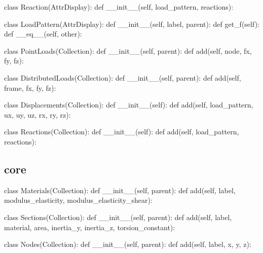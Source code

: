 \begin{codigoprog}
class Reaction(AttrDisplay):
    def __init__(self, load_pattern, reactions):
\end{codigoprog}

\begin{codigoprog}
class LoadPattern(AttrDisplay):
    def __init__(self, label, parent):
    def get_f(self):
    def __eq__(self, other):
\end{codigoprog}

\begin{codigoprog}
class PointLoads(Collection):
    def __init__(self, parent):
    def add(self, node, fx, fy, fz):
\end{codigoprog}

\begin{codigoprog}
class DistributedLoads(Collection):
    def __init__(self, parent):
    def add(self, frame, fx, fy, fz):
\end{codigoprog}

\begin{codigoprog}
class Displacements(Collection):
    def __init__(self):
    def add(self, load_pattern, ux, uy, uz, rx, ry, rz):
\end{codigoprog}

\begin{codigoprog}
class Reactions(Collection):
    def __init__(self):
    def add(self, load_pattern, reactions):
\end{codigoprog}


 \subsection{core}
 
\begin{codigoprog}
class Materials(Collection):
    def __init__(self, parent):
    def add(self, label, modulus_elasticity, modulus_elasticity_shear):
\end{codigoprog}

\begin{codigoprog}
class Sections(Collection):
    def __init__(self, parent):
    def add(self, label, material, area, inertia_y, inertia_z, torsion_constant):
\end{codigoprog}

\begin{codigoprog}
class Nodes(Collection):
    def __init__(self, parent):
    def add(self, label, x, y, z):
\end{codigoprog}

